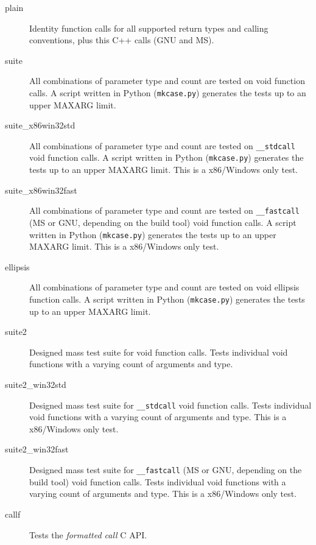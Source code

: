 \begin{description}

\item [plain] 
Identity function calls for all supported return types and calling conventions,
plus this C++ calls (GNU and MS).

\item [suite] 
All combinations of parameter type and count are tested on void function calls.
A script written in Python ({\tt mkcase.py}) generates the tests up to
an upper MAXARG limit.

\item [suite\_x86win32std] 
All combinations of parameter type and count are tested on {\tt \_\_stdcall} void function calls.
A script written in Python ({\tt mkcase.py}) generates the tests up to
an upper MAXARG limit. This is a x86/Windows only test.

\item [suite\_x86win32fast] 
All combinations of parameter type and count are tested on {\tt \_\_fastcall} (MS or GNU, depending on the build tool) void function calls.
A script written in Python ({\tt mkcase.py}) generates the tests up to
an upper MAXARG limit. This is a x86/Windows only test.

\item [ellipsis]

All combinations of parameter type and count are tested on void ellipsis 
function calls. A script written in Python ({\tt mkcase.py}) generates the 
tests up to an upper MAXARG limit.

\item [suite2]

Designed mass test suite for void function calls.
Tests individual void functions with a varying count of arguments and type.

\item [suite2\_win32std]

Designed mass test suite for {\tt \_\_stdcall} void function calls.
Tests individual void functions with a varying count of arguments and type.
This is a x86/Windows only test.

\item [suite2\_win32fast]

Designed mass test suite for {\tt \_\_fastcall} (MS or GNU, depending on the build tool) void function calls.
Tests individual void functions with a varying count of arguments and type.
This is a x86/Windows only test.

\item [callf]

Tests the \emph{formatted call}  C API.

\end{description}

